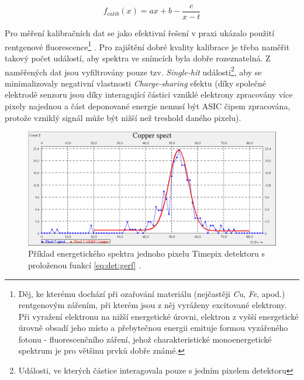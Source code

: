 \begin{equation}\label{eq:det:energyCalib}
	f_{calib}(x) = ax + b - \frac{c}{x-t}
\end{equation}

Pro měření kalibračních dat se jako efektivní řešení v praxi ukázalo použití rentgenové fluorescence\footnote{Děj, ke kterému dochází při ozařování materiálu (nejčastěji \textit{Cu}, \textit{Fe},  apod.) rentgenovým zářením, při kterém jsou z něj vyráženy excitované elektrony. Při vyražení elektronu na nižší energetické úrovni, elektron z vyšší energetické úrovně obsadí jeho místo a přebytečnou energii emituje formou vyzářeného fotonu - fluorescenčního záření, jehož charakteristické monoenergetické spektrum je pro většinu prvků dobře známé.} \cite{Jakubek-radiography_and_charge_sharing}. Pro zajištění dobré kvality kalibrace je třeba naměřit takový počet událostí, aby spektra ve snímcích byla dobře rozeznatelná. Z naměřených dat jsou vyfiltrovány pouze tzv. \textit{Single-hit} události\footnote{Události, ve kterých částice interagovala pouze s jedním pixelem detektoru}, aby se minimalizovaly negativní vlastnosti \textit{Charge-sharing} efektu (díky společné elektrodě senzoru jsou díky interagující částici vzniklé elektrony zpracovány více pixely najednou a část deponované energie nemusí být ASIC čipem zpracována, protože vzniklý signál může být nižší než treshold daného pixelu).

\begin{figure}[th]
	\begin{center}
		\includegraphics[width=15cm]{figures/calib_gerf.png}
		\caption{Příklad energetického spektra jednoho pixelu Timepix detektoru s proloženou funkcí \ref{eq:det:gerf} \cite{BegeraBcThesis2016}.}
		\label{fig:det:calib:gerf}
	\end{center}
\end{figure}

